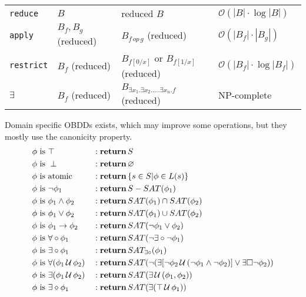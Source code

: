 \documentclass[a4paper, 10pt]{article}
\newcommand{\until}{\,\mathcal{U}\,}
\renewcommand{\O}{\mathcal{O}}
\begin{document}
\begin{mdframed}
\begin{center}
\begin{tabular}{l|l|l|l}
\hline
\texttt{reduce}    & $B$                 & reduced $B$                                                  & $\O(|B|\cdot\log|B|)$ \\
\texttt{apply}     & $B_f,B_g$ (reduced) & $B_{f\,op\,g}$ (reduced)                                     & $\O(|B_f|\cdot|B_g|)$ \\
\texttt{restrict}  & $B_f$ (reduced)     & $B_{f[0/x]}$ or $B_{f[1/x]}$ (reduced)                       & $\O(|B_f|\cdot\log|B_f|)$ \\
\texttt{$\exists$} & $B_f$ (reduced)     & $B_{\exists x_1.\exists x_2.\dots .\exists x_n.f}$ (reduced) & NP-complete
\end{tabular}
\end{center}
Domain specific OBDDs exists, which may improve some operations, but they mostly use the canonicity property.
    \begin{align*}
    \phi \text{ is } & \top                        &&: \Return \, S \\
    \phi \text{ is } & \perp                       &&: \Return \, \varnothing \\
    \phi \text{ is } & \text{atomic}               &&: \Return \, \{s\in S|\phi\in L(s)\} \\
    \phi \text{ is } & \neg\phi_1                  &&: \Return \, S-SAT(\phi_1) \\
    \phi \text{ is } & \phi_1\wedge\phi_2          &&: \Return \, SAT(\phi_1)\cap SAT(\phi_2) \\
    \phi \text{ is } & \phi_1\vee\phi_2            &&: \Return \, SAT(\phi_1)\cup SAT(\phi_2) \\
    \phi \text{ is } & \phi_1\to\phi_2             &&: \Return \, SAT(\neg\phi_1\vee\phi_2) \\
    \phi \text{ is } & \forall\circ\phi_1          &&: \Return \, SAT(\neg\exists\circ\neg\phi_1) \\
    \phi \text{ is } & \exists\circ\phi_1          &&: \Return \, SAT_{\exists\circ}(\phi_1) \\
    \phi \text{ is } & \forall(\phi_1\until\phi_2) &&: \Return \, SAT(\neg(\exists[\neg\phi_2\until(\neg\phi_1\wedge\neg\phi_2)]\vee \exists\square\neg\phi_2)) \\
    \phi \text{ is } & \exists(\phi_1\until\phi_2) &&: \Return \, SAT(\exists\until(\phi_1,\phi_2)) \\
    \phi \text{ is } & \exists\diamond\phi_1       &&: \Return \, SAT(\exists(\top\until\phi_1)) \\

\end{align*}
\end{mdframed}
\end{document}

